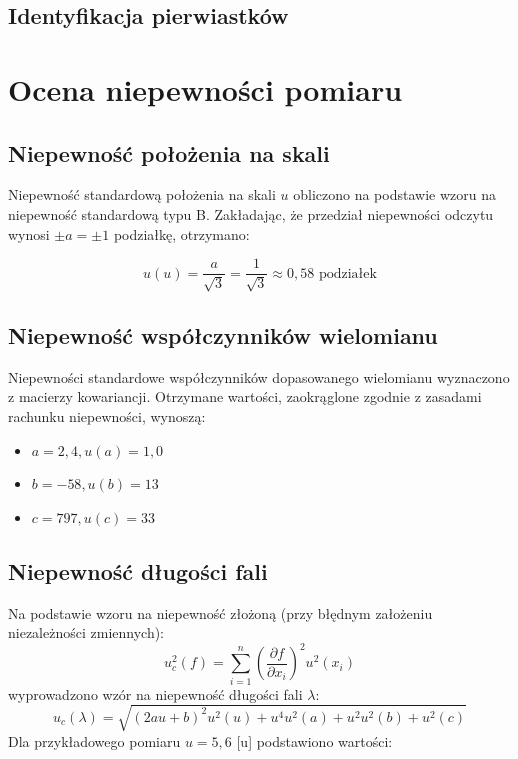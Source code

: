 \documentclass[a4paper,12pt]{article}
\begin{document}
\subsection{Identyfikacja pierwiastków}



\section{Ocena niepewności pomiaru}

\subsection{Niepewność położenia na skali}

Niepewność standardową położenia na skali $u$ obliczono na podstawie wzoru na niepewność standardową typu B. Zakładając, że przedział niepewności odczytu wynosi $\pm a = \pm 1$ podziałkę, otrzymano:

\begin{equation*}
    u(u) = \frac{a}{\sqrt{3}} = \frac{1}{\sqrt{3}} \approx 0{,}58 \text{ podziałek}
\end{equation*}


\subsection{Niepewność współczynników wielomianu}

Niepewności standardowe współczynników dopasowanego wielomianu wyznaczono z macierzy kowariancji. Otrzymane wartości, zaokrąglone zgodnie z zasadami rachunku niepewności, wynoszą:

\begin{itemize}
    \item $a = 2{,}4, u(a) = 1{,}0$
    \item $b = -58, u(b) = 13$
    \item $c = 797, u(c) = 33$
\end{itemize}

\subsection{Niepewność długości fali}


Na podstawie wzoru na niepewność złożoną (przy błędnym założeniu niezależności zmiennych):
$$
    u_c^2(f) = \sum_{i=1}^{n} \left(\frac{\partial f}{\partial x_i}\right)^2 u^2(x_i)
$$
wyprowadzono wzór na niepewność długości fali $\lambda$:
$$
    u_c(\lambda) = \sqrt{ (2au + b)^2 u^2(u) + u^4 u^2(a) + u^2 u^2(b) + u^2(c) }
$$
Dla przykładowego pomiaru $u = 5{,}6$ [u] podstawiono wartości:
\end{document}
